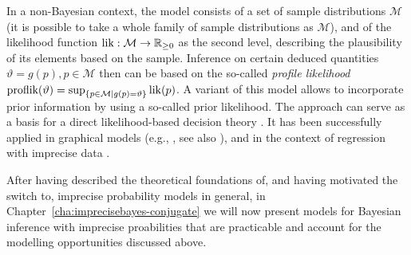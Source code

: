 In a non-Bayesian context, the model consists of a set of sample distributions $\mathcal{M}$
(it is possible to take a whole family of sample distributions as $\mathcal{M}$),
and of the likelihood function $\operatorname{lik}: \mathcal{M} \to \mathbb{R}_{\ge 0}$ as the second level,
describing the plausibility of its elements based on the sample.
Inference on certain deduced quantities $\vartheta=g\left(p\right), p \in \mathcal{M}$
then can be based on the so-called \emph{profile likelihood}
$\text{proflik}(\vartheta) = \sup_{\{p \in \mathcal{M} \mid g(p)=\vartheta\}} \operatorname{lik}(p)$.
A variant of this model allows to incorporate prior information by using a so-called prior likelihood.
The approach can serve as a basis for a direct likelihood-based decision theory \parencite{2007a:cattaneo, 2012:cattaneo-technicalRep}.
It has been successfully applied in graphical models (e.g., \cite{2011:4:isipta},
see also \cite[\S 4.3]{itip-classification}), and in the context of regression with imprecise data
\parencite{2012:cattaneo-wiencierz}.

\medskip

After having described the theoretical foundations of, and having motivated the switch to, imprecise probability models in general,
in Chapter~\ref{cha:imprecisebayes-conjugate} we will now present 
models for Bayesian inference with imprecise proabilities
that are practicable and account for the modelling opportunities discussed above. %



